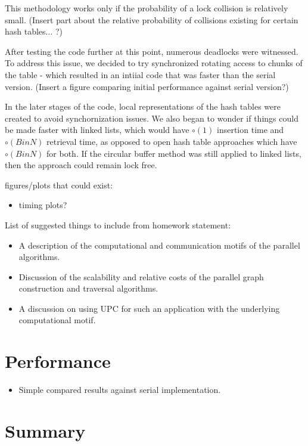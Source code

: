 \documentclass{article}
\begin{document}
 This methodology works only if the probability of a lock collision is relatively small. ({\color{red}Insert part about the relative probability of collisions existing for certain hash tables... ?}) 


After testing the code further at this point, numerous deadlocks were witnessed. To address this issue, we decided to try synchronized rotating access to chunks of the table - which resulted in an intiial code that was faster than the serial version. ({\color{red}Insert a figure comparing initial performance against serial version?})

In the later stages of the code, local representations of the hash tables were created to avoid synchornization issues. We also began to wonder if things could be  made faster with linked lists, which would have $\circ (1)$ insertion time and $\circ(BinN)$ retrieval time, as opposed to open hash table approaches which have $\circ (BinN)$ for both. If the circular buffer method was still applied to linked lists, then the approach could remain lock free. 




figures/plots that could exist:
\begin{itemize}
\item timing plots?
\end{itemize}

List of suggested things to include from homework statement:
\begin{itemize}
\item A description of the computational and communication motifs of the parallel algorithms.
\item Discussion of the scalability and relative costs of the parallel graph construction and traversal algorithms.
\item A discussion on using UPC for such an application with the underlying computational motif.
\end{itemize}

\section{Performance}
\begin{itemize}
\item Simple compared results against serial implementation.
\end{itemize}

\section{Summary}
\end{document}
